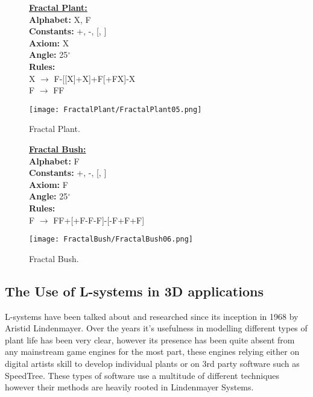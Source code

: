 \begin{figure}[htbp]
	\raggedright
	\textbf{\underline{Fractal Plant:}} \\
	\textbf{Alphabet:} X, F\\
	\textbf{Constants:} +, -, [, ] \\
	\textbf{Axiom:} X \\
	\textbf{Angle:} 25$^\circ$ \\
	\textbf{Rules:} \\
	X $\rightarrow$ F-[[X]+X]+F[+FX]-X\\
	F $\rightarrow$ FF \\
	{\centering
		\vspace{7px}
		\texttt{[image: FractalPlant/FractalPlant05.png]}
		\caption{Fractal Plant.}
	}
\end{figure}
\begin{figure}[htbp]
	\raggedright
	\textbf{\underline{Fractal Bush:}} \\
	\textbf{Alphabet:} F\\
	\textbf{Constants:} +, -, [, ] \\
	\textbf{Axiom:} F \\
	\textbf{Angle:} 25$^\circ$ \\
	\textbf{Rules:} \\
	F $\rightarrow$ FF+[+F-F-F]-[-F+F+F]\\
	{\centering
		\vspace{7px}
		\texttt{[image: FractalBush/FractalBush06.png]}
		\caption{Fractal Bush.}
	}
\end{figure}

\FloatBarrier

\subsection{The Use of L-systems in 3D applications}

\begin{flushleft}

L-systems have been talked about and researched since its inception in 1968 by Aristid Lindenmayer. Over the years it's usefulness in modelling different types of plant life has been very clear, however its presence has been quite absent from any mainstream game engines for the most part, these engines relying either on digital artists skill to develop individual plants or on 3rd party software such as SpeedTree. These types of software use a multitude of different techniques however their methods are heavily rooted in Lindenmayer Systems. 

\end{flushleft}

